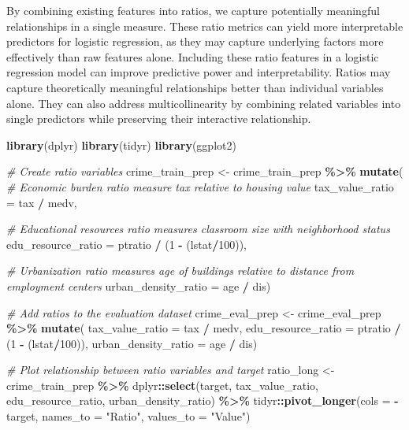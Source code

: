 \documentclass[
]{article}
\newenvironment{Shaded}{\begin{snugshade}}{\end{snugshade}}
\newcommand{\AttributeTok}[1]{\textcolor[rgb]{0.13,0.29,0.53}{#1}}
\newcommand{\CommentTok}[1]{\textcolor[rgb]{0.56,0.35,0.01}{\textit{#1}}}
\newcommand{\DecValTok}[1]{\textcolor[rgb]{0.00,0.00,0.81}{#1}}
\newcommand{\FunctionTok}[1]{\textcolor[rgb]{0.13,0.29,0.53}{\textbf{#1}}}
\newcommand{\NormalTok}[1]{#1}
\newcommand{\OtherTok}[1]{\textcolor[rgb]{0.56,0.35,0.01}{#1}}
\newcommand{\SpecialCharTok}[1]{\textcolor[rgb]{0.81,0.36,0.00}{\textbf{#1}}}
\newcommand{\StringTok}[1]{\textcolor[rgb]{0.31,0.60,0.02}{#1}}
\begin{document}
By combining existing features into ratios, we capture potentially
meaningful relationships in a single measure. These ratio metrics can
yield more interpretable predictors for logistic regression, as they may
capture underlying factors more effectively than raw features alone.
Including these ratio features in a logistic regression model can
improve predictive power and interpretability. Ratios may capture
theoretically meaningful relationships better than individual variables
alone. They can also address multicollinearity by combining related
variables into single predictors while preserving their interactive
relationship.

\begin{Shaded}
\begin{Highlighting}[]
\FunctionTok{library}\NormalTok{(dplyr)}
\FunctionTok{library}\NormalTok{(tidyr)}
\FunctionTok{library}\NormalTok{(ggplot2)}

\CommentTok{\# Create ratio variables}
\NormalTok{crime\_train\_prep }\OtherTok{\textless{}{-}}\NormalTok{ crime\_train\_prep }\SpecialCharTok{\%\textgreater{}\%}
  \FunctionTok{mutate}\NormalTok{(}
    \CommentTok{\# Economic burden ratio measure tax relative to housing value}
    \AttributeTok{tax\_value\_ratio =}\NormalTok{ tax }\SpecialCharTok{/}\NormalTok{ medv,}
    
    \CommentTok{\# Educational resources ratio measures classroom size with neighborhood status}
    \AttributeTok{edu\_resource\_ratio =}\NormalTok{ ptratio }\SpecialCharTok{/}\NormalTok{ (}\DecValTok{1} \SpecialCharTok{{-}}\NormalTok{ (lstat}\SpecialCharTok{/}\DecValTok{100}\NormalTok{)),}
    
    \CommentTok{\# Urbanization ratio measures age of buildings relative to distance from employment centers}
    \AttributeTok{urban\_density\_ratio =}\NormalTok{ age }\SpecialCharTok{/}\NormalTok{ dis)}

\CommentTok{\# Add ratios to the evaluation dataset}
\NormalTok{crime\_eval\_prep }\OtherTok{\textless{}{-}}\NormalTok{ crime\_eval\_prep }\SpecialCharTok{\%\textgreater{}\%}
  \FunctionTok{mutate}\NormalTok{(}
    \AttributeTok{tax\_value\_ratio =}\NormalTok{ tax }\SpecialCharTok{/}\NormalTok{ medv,}
    \AttributeTok{edu\_resource\_ratio =}\NormalTok{ ptratio }\SpecialCharTok{/}\NormalTok{ (}\DecValTok{1} \SpecialCharTok{{-}}\NormalTok{ (lstat}\SpecialCharTok{/}\DecValTok{100}\NormalTok{)),}
    \AttributeTok{urban\_density\_ratio =}\NormalTok{ age }\SpecialCharTok{/}\NormalTok{ dis)}

\CommentTok{\# Plot relationship between ratio variables and target}
\NormalTok{ratio\_long }\OtherTok{\textless{}{-}}\NormalTok{ crime\_train\_prep }\SpecialCharTok{\%\textgreater{}\%}
\NormalTok{  dplyr}\SpecialCharTok{::}\FunctionTok{select}\NormalTok{(target, tax\_value\_ratio, edu\_resource\_ratio, urban\_density\_ratio) }\SpecialCharTok{\%\textgreater{}\%}
\NormalTok{  tidyr}\SpecialCharTok{::}\FunctionTok{pivot\_longer}\NormalTok{(}\AttributeTok{cols =} \SpecialCharTok{{-}}\NormalTok{target, }\AttributeTok{names\_to =} \StringTok{"Ratio"}\NormalTok{, }\AttributeTok{values\_to =} \StringTok{"Value"}\NormalTok{)}


\end{Highlighting}
\end{Shaded}
\end{document}
